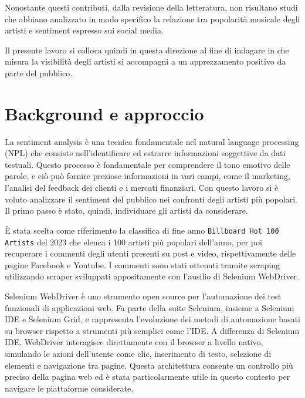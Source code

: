 \documentclass[conference]{IEEEtran}
\begin{document}
Nonostante questi contributi, dalla revisione della letteratura, non risultano studi
che abbiano analizzato in modo specifico la relazione tra popolarità musicale degli
artisti e sentiment espresso sui social media.

Il presente lavoro si colloca quindi in questa direzione al fine di indagare in che misura la
visibilità degli artisti si accompagni a un apprezzamento positivo da parte del pubblico.


\section{Background e approccio}\label{sec:background}

La sentiment analysis è una tecnica fondamentale nel natural language processing (NPL) che
consiste nell'identificare ed estrarre informazioni soggettive da dati testuali. Questo processo
è fondamentale per comprendere il tono emotivo delle parole, e ciò può fornire preziose informazioni
in vari campi, come il marketing, l'analisi del feedback dei clienti e i mercati finanziari.
Con questo lavoro si è voluto analizzare il sentiment del pubblico nei confronti degli artisti
più popolari. Il primo passo è stato, quindi, individuare gli artisti da considerare.

È stata scelta come riferimento la classifica di fine anno \texttt{Billboard Hot 100 Artists}
del 2023 che elenca i 100 artisti più popolari dell'anno, per poi recuperare i commenti
degli utenti presenti su post e video, rispettivamente delle pagine Facebook e Youtube.
I commenti sono stati ottenuti tramite scraping utilizzando scraper sviluppati appositamente
con l'ausilio di Selenium WebDriver.

Selenium WebDriver è uno strumento open source per l'automazione dei test funzionali di
applicazioni web. Fa parte della suite Selenium, insieme a Selenium IDE e Selenium Grid, e
rappresenta l'evoluzione dei metodi di automazione basati su browser rispetto a strumenti più
semplici come l'IDE.
A differenza di Selenium IDE, WebDriver interagisce direttamente con il browser a livello nativo,
simulando le azioni dell'utente come clic, inserimento di testo, selezione di elementi e navigazione
tra pagine. Questa architettura consente un controllo più preciso della pagina web ed è stata
particolarmente utile in questo contesto per navigare le piattaforme considerate.
\end{document}
